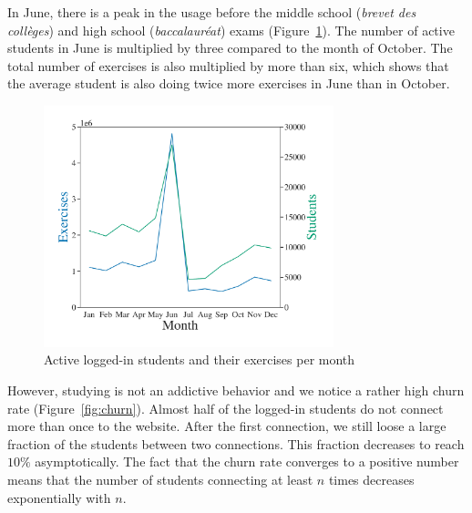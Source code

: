 In June, there is a peak in the usage before the middle school (\emph{brevet des collèges}) and high school (\emph{baccalaur\'eat}) exams (Figure~\ref{fig:usage}). The number of active students in June is multiplied by three compared to the month of October. The total number of exercises is also multiplied by more than six, which shows that the average student is also doing twice more exercises in June than in October.  

\begin{figure}[!ht]
\centering
\includegraphics[clip, width= 0.75\textwidth]{2literature/fig/student-exercise.pdf}
\caption{Active logged-in students and their exercises per month} %
\label{fig:usage}
\end{figure}

However, studying is not an addictive behavior and we notice a rather high churn rate (Figure~\ref{fig:churn}). Almost half of the logged-in students do not connect more than once to the website. After the first connection, we still loose a large fraction of the students between two connections. This fraction decreases to reach $10\%$ asymptotically. The fact that the churn rate converges to a positive number means that the number of students connecting at least $n$ times decreases exponentially with $n$. 

